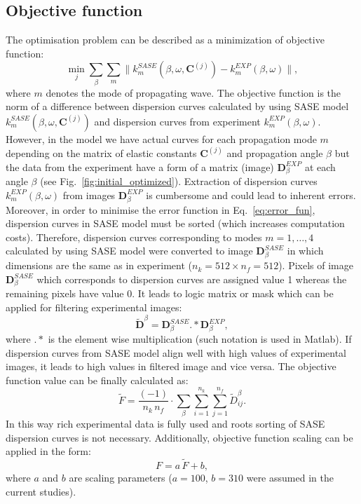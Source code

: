\documentclass[preprint,12pt]{elsarticle}
\newcommand{\matr}[1]{\mathbf{#1}} %
\begin{document}
	\subsection{Objective function}
	The optimisation problem can be described as a minimization of objective function:
	\begin{equation}
	\min_j \sum_{\beta}\sum_{m} \| k^{SASE}_{m}(\beta, \omega,\matr{C}^{(j)}) 
-k^{EXP}_{m}(\beta,\omega) \|,
	\label{eq:error_fun}
	\end{equation}
	where \(m\) denotes the mode of propagating wave.
	The objective function is the norm of a difference between dispersion curves 
	calculated by using SASE model \(k^{SASE}_{m}(\beta, \omega,\matr{C}^{(j)})\) and 
	dispersion curves from experiment \(k^{EXP}_{m}(\beta,\omega)\). However, in the 
	model we have actual curves for each propagation mode \(m\) depending on the 
	matrix of elastic constants \(\matr{C}^{(j)}\) and propagation angle \(\beta\) but the 
	data from the experiment have a form of a matrix (image) \(\matr{D}^{EXP}_{\beta}\) 
	at each angle \(\beta\) (see Fig.~\ref{fig:initial_optimized}). Extraction of dispersion 
	curves \(k^{EXP}_{m}(\beta,\omega)\) from images \(\matr{D}^{EXP}_{\beta}\) is 
	cumbersome and could lead to inherent errors. Moreover, in order to minimise the 
	error function in Eq.~\ref{eq:error_fun}, dispersion curves in SASE model must be 
	sorted (which increases computation costs). Therefore, dispersion curves 
	corresponding to modes \(m=1,\ldots, 4\) calculated by using SASE model were 
	converted to image \(\matr{D}^{SASE}_{\beta}\) in which dimensions are the same 
	as in experiment (\(n_k=512 \times n_f= 512\)). Pixels of image 
	\(\matr{D}^{SASE}_{\beta} \) which corresponds to dispersion curves are assigned 
	value 1 whereas the remaining pixels have value 0. It leads to logic matrix or mask 
	which can be applied for filtering experimental images: 
	\begin{equation}
		\tilde{\matr{D}}^{\beta} =  \matr{D}^{SASE}_{\beta}  .*    \matr{D}^{EXP}_{\beta} ,
		\label{eq:objective_fun}
   \end{equation}	
    where \(.*\) is the element wise multiplication (such notation is used in Matlab). If 
    dispersion curves from SASE model align well with high values of experimental 
    images, it leads to high values in filtered image and vice versa.
	The objective function value can be finally calculated as: 
	\begin{equation}
	\tilde{F} = \frac{(-1)}{n_k \, n_f}  \cdot \sum_{\beta}  \sum_{i=1}^{n_k} 
	\sum_{j=1}^{n_f}	
\tilde{D}_{ij}^{\beta}. 
	\end{equation}
	In this way rich experimental data is fully used and roots sorting of SASE dispersion 
	curves is not 
necessary. Additionally, objective function scaling can be applied in the form:
	\begin{equation}
	F = a \,  \tilde{F} + b,
	\end{equation}
	where \(a\) and \(b\) are scaling parameters (\(a=100\), \(b=310\) were assumed in 
	the current studies).
\end{document}
